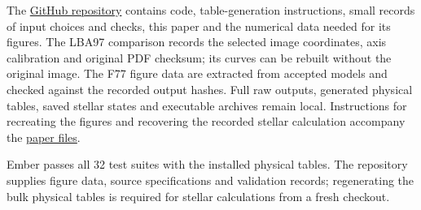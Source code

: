 \documentclass[11pt,letterpaper]{article}
\newcommand{\doc}[2]{\href{https://github.com/oklo/ember/blob/master/#1}{#2}}
\begin{document}
The \href{https://github.com/oklo/ember}{GitHub repository} contains code,
table-generation instructions, small records of input choices and checks,
this paper and the numerical data needed for its figures. The LBA97 comparison
records the selected image coordinates, axis calibration and original PDF
checksum; its curves can be rebuilt without the original image. The F77 figure data
are extracted from accepted models and checked against the recorded output
hashes. Full raw outputs, generated physical tables, saved stellar states and
executable archives remain local. Instructions for recreating the figures
and recovering the recorded stellar calculation accompany the
\doc{docs/reports/2026-09-10/README.md}{paper files}.

Ember passes all 32 test suites with the installed physical tables. The
repository supplies figure data, source specifications and validation records;
regenerating the bulk physical tables is required for stellar calculations
from a fresh checkout.
\end{document}
